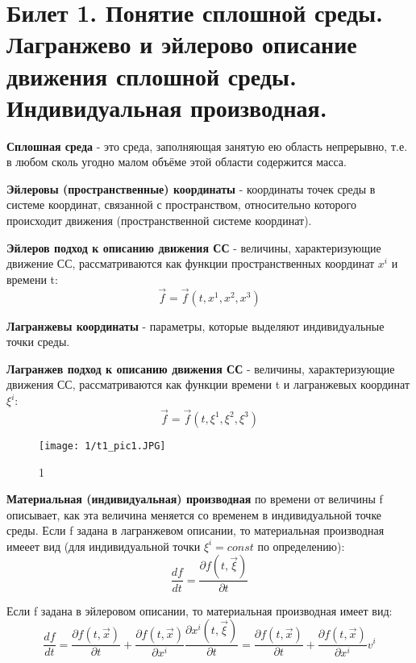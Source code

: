 \newpage
\section{Билет 1. Понятие сплошной среды. Лагранжево и эйлерово описание движения сплошной среды. Индивидуальная производная.}

\textbf{Сплошная среда} - это среда, заполняющая занятую ею область непрерывно, т.е. в любом сколь угодно малом объёме этой области содержится масса.

\textbf{Эйлеровы (пространственные) координаты} - координаты точек среды в системе координат, связанной с пространством, относительно которого происходит движения (пространственной системе координат).

\textbf{Эйлеров подход к описанию движения СС} - величины, характеризующие движение СС, рассматриваются как функции пространственных координат $x^i$ и времени t: $$\vec{f} = \vec{f}(t, x^1, x^2, x^3)$$

\textbf{Лагранжевы координаты} - параметры, которые выделяют индивидуальные точки среды.

\textbf{Лагранжев подход к описанию движения СС} - величины, характеризующие движения СС, рассматриваются как функции времени t и лагранжевых координат $\xi^i$: $$\vec{f} = \vec{f}(t, \xi^1, \xi^2, \xi^3)$$
\begin{figure}[h]
\texttt{[image: 1/t1\_pic1.JPG]}
\caption{\label{ris:image1_2}1}
\end{figure}

\textbf{Материальная (индивидуальная) производная} по времени от величины f описывает, как эта величина меняется со временем в индивидуальной точке среды. Если f задана в лагранжевом описании, то материальная производная имееет вид (для индивидуальной точки $\xi^i = const $ по определению): $$\frac{df}{dt} = \frac{\partial f(t,\vec{\xi})}{\partial t}$$

Если f задана в эйлеровом описании, то материальная производная имеет вид: $$\frac{df}{dt} = \frac{\partial f(t,\vec{x})}{\partial t} + \frac{\partial f(t, \vec{x})}{\partial x^i}\frac{\partial x^i(t,\vec{\xi})}{\partial t} = \frac{\partial f(t,\vec{x})}{\partial t} + \frac{\partial f(t, \vec{x})}{\partial x^i}v^i$$
